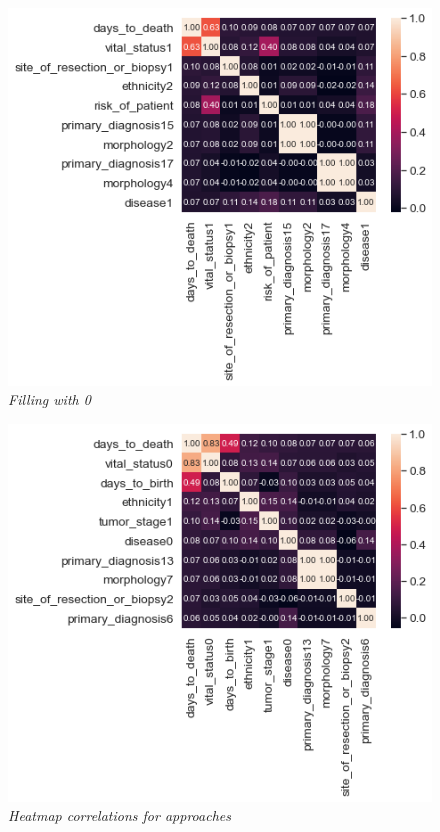 \documentclass[onecolumn]{article}
\begin{document}
\begin{figure}[h]
\caption{\emph{Heatmap correlations for approaches}}
    \centering
    \begin{minipage}{0.4\textwidth}
        \centering
        \includegraphics[width=1.0\textwidth]{sıfır.png} %
        \emph{\small Filling with 0}\par\medskip
    \end{minipage}
    \begin{minipage}{0.4\textwidth}
        \centering
        \includegraphics[width=1.0\textwidth]{90yas.png} %

\end{minipage}
\end{figure}
\end{document}
